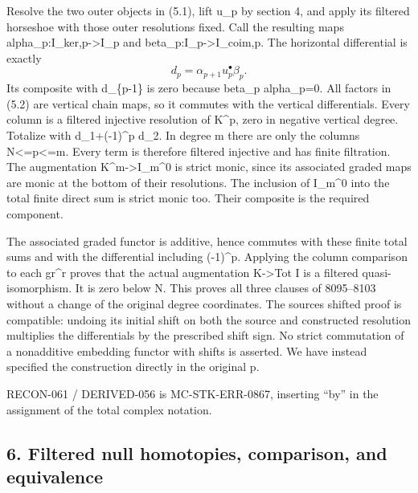 \documentclass[11pt]{article}
\begin{document}
Resolve the two outer objects in (5.1)\allowbreak{},\allowbreak{} lift u\_\allowbreak{}p by section 4,\allowbreak{} and apply its filtered horseshoe with those outer resolutions fixed. Call the resulting maps alpha\_\allowbreak{}p:\allowbreak{}I\_\allowbreak{}ker,\allowbreak{}p\allowbreak{}->I\_\allowbreak{}p and beta\_\allowbreak{}p:\allowbreak{}I\_\allowbreak{}p\allowbreak{}->I\_\allowbreak{}coim,\allowbreak{}p. The horizontal differential is exactly \[
 d_p=\alpha_{p+1}u_p^\bullet\beta_p.                          \tag{5.2}
\] Its composite with d\_\allowbreak{}\{p-1\} is zero because beta\_\allowbreak{}p alpha\_\allowbreak{}p\allowbreak{}=0. All factors in (5.2)\allowbreak{} are vertical chain maps,\allowbreak{} so it commutes with the vertical differentials. Every column is a filtered injective resolution of K\textasciicircum{}p,\allowbreak{} zero in negative vertical degree. Totalize with d\_\allowbreak{}1\allowbreak{}+(-1)\allowbreak{}\textasciicircum{}p d\_\allowbreak{}2. In degree m there are only the columns N<\allowbreak{}=p<\allowbreak{}=m. Every term is therefore filtered injective and has finite filtration. The augmentation K\textasciicircum{}m\allowbreak{}->I\_\allowbreak{}m\textasciicircum{}0 is strict monic,\allowbreak{} since its associated graded maps are monic at the bottom of their resolutions. The inclusion of I\_\allowbreak{}m\textasciicircum{}0 into the total finite direct sum is strict monic too. Their composite is the required component.

The associated graded functor is additive,\allowbreak{} hence commutes with these finite total sums and with the differential including (-1)\allowbreak{}\textasciicircum{}p. Applying the column comparison to each gr\^{}r proves that the actual augmentation K\allowbreak{}->Tot I is a filtered quasi-isomorphism. It is zero below N. This proves all three clauses of 8095–\allowbreak{}8103 without a change of the original degree coordinates. The source\textquotesingle s shifted proof is compatible:\allowbreak{} undoing its initial shift on both the source and constructed resolution multiplies the differentials by the prescribed shift sign. No strict commutation of a nonadditive embedding functor with shifts is asserted. We have instead specified the construction directly in the original p.

RECON-061 /\allowbreak{} DERIVED-056 is MC-STK-ERR-0867,\allowbreak{} inserting ``by'' in the assignment of the total complex notation.

\subsection{\texorpdfstring{6. Filtered null homotopies,\allowbreak{} comparison,\allowbreak{} and equivalence}{6. Filtered null   and equivalence}}\label{proofs-7589-8350-filtered-null-homotopies-comparison-and-equivalence}
\end{document}
